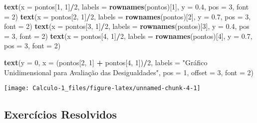 \documentclass[]{book}
\newenvironment{Shaded}{\begin{snugshade}}{\end{snugshade}}
\newcommand{\KeywordTok}[1]{\textcolor[rgb]{0.13,0.29,0.53}{\textbf{#1}}}
\newcommand{\DataTypeTok}[1]{\textcolor[rgb]{0.13,0.29,0.53}{#1}}
\newcommand{\DecValTok}[1]{\textcolor[rgb]{0.00,0.00,0.81}{#1}}
\newcommand{\FloatTok}[1]{\textcolor[rgb]{0.00,0.00,0.81}{#1}}
\newcommand{\StringTok}[1]{\textcolor[rgb]{0.31,0.60,0.02}{#1}}
\newcommand{\OperatorTok}[1]{\textcolor[rgb]{0.81,0.36,0.00}{\textbf{#1}}}
\newcommand{\NormalTok}[1]{#1}
\begin{document}
\begin{Shaded}
\begin{Highlighting}[]
\KeywordTok{text}\NormalTok{(}\DataTypeTok{x =}\NormalTok{ pontos[}\DecValTok{1}\NormalTok{, }\DecValTok{1}\NormalTok{]}\OperatorTok{/}\DecValTok{2}\NormalTok{, }\DataTypeTok{labels =} \KeywordTok{rownames}\NormalTok{(pontos)[}\DecValTok{1}\NormalTok{], }\DataTypeTok{y =} \FloatTok{0.4}\NormalTok{,}
     \DataTypeTok{pos =} \DecValTok{3}\NormalTok{, }\DataTypeTok{font =} \DecValTok{2}\NormalTok{)}
\KeywordTok{text}\NormalTok{(}\DataTypeTok{x =}\NormalTok{ pontos[}\DecValTok{2}\NormalTok{, }\DecValTok{1}\NormalTok{]}\OperatorTok{/}\DecValTok{2}\NormalTok{, }\DataTypeTok{labels =} \KeywordTok{rownames}\NormalTok{(pontos)[}\DecValTok{2}\NormalTok{], }\DataTypeTok{y =} \FloatTok{0.7}\NormalTok{,}
     \DataTypeTok{pos =} \DecValTok{3}\NormalTok{, }\DataTypeTok{font =} \DecValTok{2}\NormalTok{)}
\KeywordTok{text}\NormalTok{(}\DataTypeTok{x =}\NormalTok{ pontos[}\DecValTok{3}\NormalTok{, }\DecValTok{1}\NormalTok{]}\OperatorTok{/}\DecValTok{2}\NormalTok{, }\DataTypeTok{labels =} \KeywordTok{rownames}\NormalTok{(pontos)[}\DecValTok{3}\NormalTok{], }\DataTypeTok{y =} \FloatTok{0.4}\NormalTok{,}
     \DataTypeTok{pos =} \DecValTok{3}\NormalTok{, }\DataTypeTok{font =} \DecValTok{2}\NormalTok{)}
\KeywordTok{text}\NormalTok{(}\DataTypeTok{x =}\NormalTok{ pontos[}\DecValTok{4}\NormalTok{, }\DecValTok{1}\NormalTok{]}\OperatorTok{/}\DecValTok{2}\NormalTok{, }\DataTypeTok{labels =} \KeywordTok{rownames}\NormalTok{(pontos)[}\DecValTok{4}\NormalTok{], }\DataTypeTok{y =} \FloatTok{0.7}\NormalTok{,}
     \DataTypeTok{pos =} \DecValTok{3}\NormalTok{, }\DataTypeTok{font =} \DecValTok{2}\NormalTok{)}

\KeywordTok{text}\NormalTok{(}\DataTypeTok{y =} \DecValTok{0}\NormalTok{, }\DataTypeTok{x =}\NormalTok{ (pontos[}\DecValTok{2}\NormalTok{, }\DecValTok{1}\NormalTok{] }\OperatorTok{+}\StringTok{ }\NormalTok{pontos[}\DecValTok{4}\NormalTok{, }\DecValTok{1}\NormalTok{])}\OperatorTok{/}\DecValTok{2}\NormalTok{,}
     \DataTypeTok{labels =} \StringTok{"Gráfico Unidimensional para Avaliação das Desigualdades"}\NormalTok{,}
     \DataTypeTok{pos =} \DecValTok{1}\NormalTok{, }\DataTypeTok{offset =} \DecValTok{3}\NormalTok{, }\DataTypeTok{font =} \DecValTok{2}\NormalTok{)}
\end{Highlighting}
\end{Shaded}

\begin{center}\texttt{[image: Calculo-1\_files/figure-latex/unnamed-chunk-4-1]} \end{center}

\subsection{Exercícios Resolvidos}\label{exercicios-resolvidos}
\end{document}
